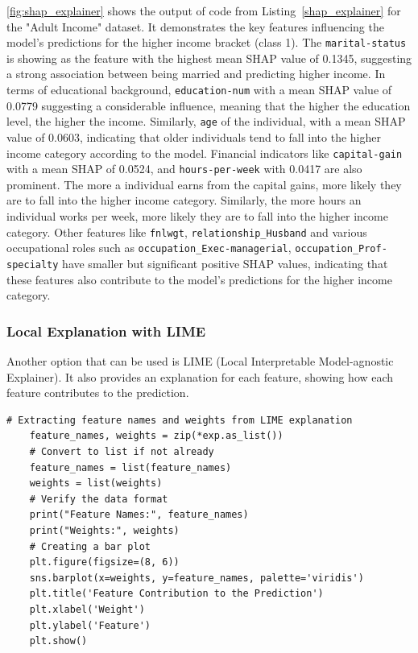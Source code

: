 \documentclass[10pt,journal,compsoc]{IEEEtran}
\begin{document}
\autoref{fig:shap_explainer} shows the output of code from Listing~\ref{shap_explainer} for the "Adult Income" dataset. It demonstrates the key features influencing the model's predictions for the higher income bracket (class 1).
The \texttt{marital-status} is showing as the feature with the highest mean SHAP value of 0.1345, suggesting a strong association between being married and predicting higher income.
In terms of educational background, \texttt{education-num} with a mean SHAP value of 0.0779 suggesting a considerable influence, meaning that the higher the education level, the higher the income. Similarly, 
\texttt{age} of the individual, with a mean SHAP value of 0.0603, indicating that older individuals tend to fall into the higher income category according to the model.
Financial indicators like \texttt{capital-gain} with a mean SHAP of 0.0524, and \texttt{hours-per-week} with 0.0417 are also prominent.
The more a individual earns from the capital gains, more likely they are to fall into the higher income category. Similarly, the more hours an individual works per week, more likely they are to fall into the higher income category.
Other features like \texttt{fnlwgt}, \texttt{relationship\_Husband} and various occupational roles such as \texttt{occupation\_Exec-managerial}, \texttt{occupation\_Prof-specialty} have smaller but significant positive SHAP values, indicating that these features also contribute to the model's predictions for the higher income category.


\subsubsection{Local Explanation with LIME}

Another option that can be used is LIME (Local Interpretable Model-agnostic Explainer). It also provides an explanation for each feature, showing how each feature contributes to the prediction.


\begin{lstlisting}[caption=LIME Explainer , label=lime_explainer]
    # Extracting feature names and weights from LIME explanation
    feature_names, weights = zip(*exp.as_list())    
    # Convert to list if not already
    feature_names = list(feature_names)
    weights = list(weights)    
    # Verify the data format
    print("Feature Names:", feature_names)
    print("Weights:", weights)    
    # Creating a bar plot
    plt.figure(figsize=(8, 6))
    sns.barplot(x=weights, y=feature_names, palette='viridis')
    plt.title('Feature Contribution to the Prediction')
    plt.xlabel('Weight')
    plt.ylabel('Feature')
    plt.show()
\end{lstlisting}
\end{document}
